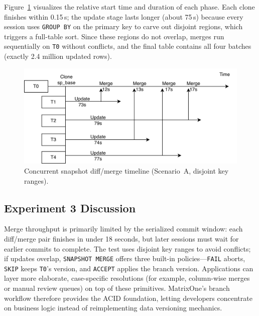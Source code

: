 \documentclass[sigconf,nonacm]{acmart} %
\begin{document}
Figure~\ref{fig:collab-timeline} visualizes the relative start time and
duration of each phase.  Each clone finishes within 0.15\,s; the update
stage lasts longer (about 75\,s) because every session uses
\texttt{GROUP BY} on the primary key to carve out disjoint regions,
which triggers a full-table sort.  Since these regions do not overlap,
merges run sequentially on \texttt{T0} without conflicts, and the final
table contains all four batches (exactly 2.4 million updated rows).

\begin{figure}[h]
  \centering
  \includegraphics[width=0.9\linewidth]{e3a.png}
  \caption{Concurrent snapshot diff/merge timeline (Scenario~A, disjoint key ranges).}
  \label{fig:collab-timeline}
\end{figure}

\subsection{Experiment 3 Discussion}
Merge throughput is primarily limited by the serialized commit window:
each diff/merge pair finishes in under 18 seconds, but later sessions
must wait for earlier commits to complete.  The test uses disjoint key
ranges to avoid conflicts; if updates overlap, \texttt{SNAPSHOT MERGE}
offers three built-in policies—\texttt{FAIL} aborts, \texttt{SKIP} keeps
\texttt{T0}'s version, and \texttt{ACCEPT} applies the branch version.
Applications can layer more elaborate, case-specific resolutions (for
example, column-wise merges or manual review queues) on top of these
primitives.  MatrixOne's branch workflow therefore provides the ACID
foundation, letting developers concentrate on business logic instead of
reimplementing data versioning mechanics.
\end{document}
